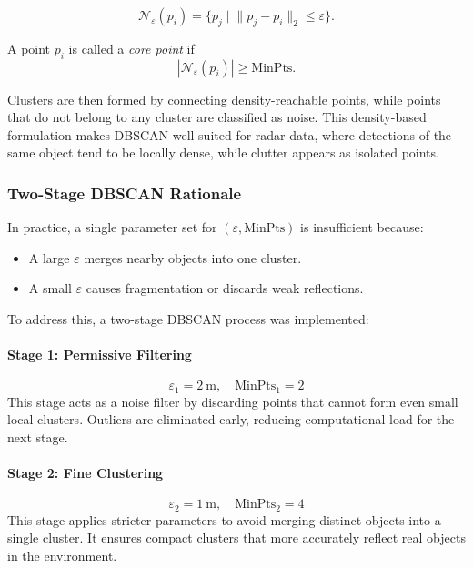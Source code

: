 \begin{equation}
    \mathcal{N}_{\varepsilon}(p_i) = \{ p_j \mid \lVert p_j - p_i \rVert_2 \leq \varepsilon \}.
\end{equation}

A point $p_i$ is called a \textit{core point} if
\begin{equation}
    |\mathcal{N}_{\varepsilon}(p_i)| \geq \text{MinPts}.
\end{equation}

Clusters are then formed by connecting density-reachable points, while points that do not belong to any cluster are classified as noise.  
This density-based formulation makes DBSCAN well-suited for radar data, where detections of the same object tend to be locally dense, while clutter appears as isolated points.

\subsubsection*{Two-Stage DBSCAN Rationale}
In practice, a single parameter set for $(\varepsilon, \text{MinPts})$ is insufficient because:
\begin{itemize}
    \item A large $\varepsilon$ merges nearby objects into one cluster.
    \item A small $\varepsilon$ causes fragmentation or discards weak reflections.
\end{itemize}

To address this, a two-stage DBSCAN process was implemented:

\paragraph{Stage 1: Permissive Filtering}
\begin{equation}
    \varepsilon_1 = \SI{2}{\meter}, \quad \text{MinPts}_1 = 2
\end{equation}
This stage acts as a noise filter by discarding points that cannot form even small local clusters.  
Outliers are eliminated early, reducing computational load for the next stage.

\paragraph{Stage 2: Fine Clustering}
\begin{equation}
    \varepsilon_2 = \SI{1}{\meter}, \quad \text{MinPts}_2 = 4
\end{equation}
This stage applies stricter parameters to avoid merging distinct objects into a single cluster.  
It ensures compact clusters that more accurately reflect real objects in the environment.


